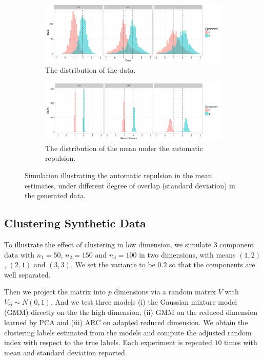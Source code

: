 \documentclass[12pt]{article}
\begin{document}
\begin{figure}[H]
 \centering
  \begin{subfigure}[b]{1\textwidth}
 \includegraphics[width=1\textwidth]{pics/repulData}
  \caption{The distribution of the data.}
\label{fig:simRepulY}
\end{subfigure}
  \hfill
   \begin{subfigure}[b]{1\textwidth}
 \includegraphics[width=1\textwidth]{pics/repulMean}
  \caption{The distribution of the mean under the automatic repulsion.}
  \label{fig:simRepulM}
\end{subfigure}
\caption{Simulation illustrating the automatic repulsion in the mean estimates, under different degree of overlap (standard deviation) in the generated data.}
 \end{figure}



\subsection{Clustering Synthetic Data}

To illustrate the effect of clustering in low dimension, we simulate $3$ component data with $n_1=50$, $n_2=150$ and $n_3=100$ in two dimensions, with means $(1,2)$, $(2,1)$ and $(3,3)$. We set the variance to be $0.2$ so that the components are well separated.

Then we project the matrix into $p$ dimensions via a random matrix $V$ with $V_{ij}\sim N(0,1)$. And we test three models (i) the Gaussian mixture model (GMM) directly on the the high dimension, (ii) GMM on the reduced dimension learned by PCA and (iii) ARC on adapted reduced dimension. We obtain the clustering labels estimated from the models and compute the  adjusted random index with respect to the true labels. Each experiment is repeated $10$ times with mean and standard deviation reported.
\end{document}
